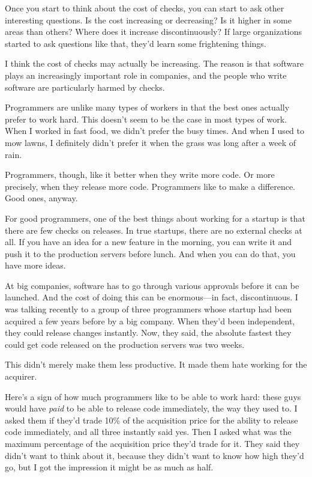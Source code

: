 \documentclass[12pt]{book}
\begin{document}
Once you start to think about the cost of checks, you can start to ask
other interesting questions. Is the cost increasing or decreasing? Is it
higher in some areas than others? Where does it increase
discontinuously? If large organizations started to ask questions like
that, they'd learn some frightening things.

I think the cost of checks may actually be increasing. The reason is
that software plays an increasingly important role in companies, and the
people who write software are particularly harmed by checks.

Programmers are unlike many types of workers in that the best ones
actually prefer to work hard. This doesn't seem to be the case in most
types of work. When I worked in fast food, we didn't prefer the busy
times. And when I used to mow lawns, I definitely didn't prefer it when
the grass was long after a week of rain.

Programmers, though, like it better when they write more code. Or more
precisely, when they release more code. Programmers like to make a
difference. Good ones, anyway.

For good programmers, one of the best things about working for a startup
is that there are few checks on releases. In true startups, there are no
external checks at all. If you have an idea for a new feature in the
morning, you can write it and push it to the production servers before
lunch. And when you can do that, you have more ideas.

At big companies, software has to go through various approvals before it
can be launched. And the cost of doing this can be enormous---in fact,
discontinuous. I was talking recently to a group of three programmers
whose startup had been acquired a few years before by a big company.
When they'd been independent, they could release changes instantly. Now,
they said, the absolute fastest they could get code released on the
production servers was two weeks.

This didn't merely make them less productive. It made them hate working
for the acquirer.

Here's a sign of how much programmers like to be able to work hard:
these guys would have \emph{paid} to be able to release code
immediately, the way they used to. I asked them if they'd trade 10\% of
the acquisition price for the ability to release code immediately, and
all three instantly said yes. Then I asked what was the maximum
percentage of the acquisition price they'd trade for it. They said they
didn't want to think about it, because they didn't want to know how high
they'd go, but I got the impression it might be as much as half.
\end{document}
